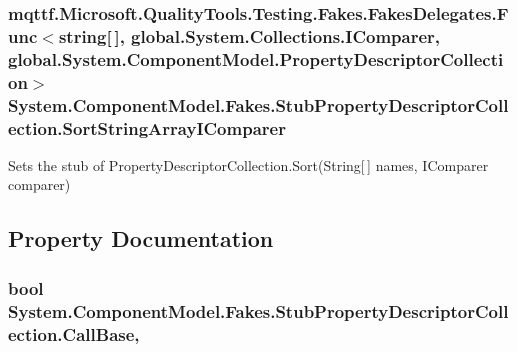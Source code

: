 \hypertarget{class_system_1_1_component_model_1_1_fakes_1_1_stub_property_descriptor_collection_a5379794ffd11bd12bf9ae9311025c1ad}{
\subsubsection[{Sort\-String\-Array\-I\-Comparer}]{\setlength{\rightskip}{0pt plus 5cm}mqttf.\-Microsoft.\-Quality\-Tools.\-Testing.\-Fakes.\-Fakes\-Delegates.\-Func$<$string\mbox{[}$\,$\mbox{]}, global.\-System.\-Collections.\-I\-Comparer, global.\-System.\-Component\-Model.\-Property\-Descriptor\-Collection$>$ System.\-Component\-Model.\-Fakes.\-Stub\-Property\-Descriptor\-Collection.\-Sort\-String\-Array\-I\-Comparer}}\label{class_system_1_1_component_model_1_1_fakes_1_1_stub_property_descriptor_collection_a5379794ffd11bd12bf9ae9311025c1ad}


Sets the stub of Property\-Descriptor\-Collection.\-Sort(\-String\mbox{[}$\,$\mbox{]} names, I\-Comparer comparer)



\subsection{Property Documentation}
\hypertarget{class_system_1_1_component_model_1_1_fakes_1_1_stub_property_descriptor_collection_a948dfd20617794dd6223d97769e9a177}{
\subsubsection[{Call\-Base}]{\setlength{\rightskip}{0pt plus 5cm}bool System.\-Component\-Model.\-Fakes.\-Stub\-Property\-Descriptor\-Collection.\-Call\-Base\hspace{0.3cm}{\ttfamily [get]}, {\ttfamily [set]}}}\label{class_system_1_1_component_model_1_1_fakes_1_1_stub_property_descriptor_collection_a948dfd20617794dd6223d97769e9a177}


